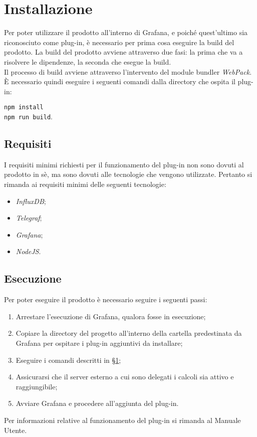 \section{Installazione}\label{Installazione}
Per poter utilizzare il prodotto all'interno di Grafana, e poiché quest'ultimo sia riconosciuto come plug-in, è necessario per prima cosa eseguire la build del prodotto.
La build del prodotto avviene attraverso due fasi: la prima che va a risolvere le dipendenze, la seconda che esegue la build.\\
Il processo di build avviene attraverso l'intervento del module bundler \textit{WebPack}.
È necessario quindi eseguire i seguenti comandi dalla directory che ospita il plug-in:
\begin{center}
	\texttt{npm install}\\
	\texttt{npm run build}.
\end{center}

\subsection{Requisiti}\label{Requisiti}
I requisiti minimi richiesti per il funzionamento del plug-in non sono dovuti al prodotto in sè, ma sono dovuti alle tecnologie che vengono utilizzate. Pertanto si rimanda ai requisiti minimi delle seguenti tecnologie:
\begin{itemize}
	\item \textit{InfluxDB};
	\item \textit{Telegraf};
	\item \textit{Grafana};
	\item \textit{NodeJS}.
\end{itemize}

\subsection{Esecuzione}\label{run}
Per poter eseguire il prodotto è necessario seguire i seguenti passi:
\begin{enumerate}
	\item Arrestare l'esecuzione di Grafana, qualora fosse in esecuzione;
	\item Copiare la directory del progetto all'interno della cartella predestinata da Grafana per ospitare i plug-in aggiuntivi da installare;
	\item Eseguire i comandi descritti in §\ref{Installazione};
	\item Assicurarsi che il server esterno a cui sono delegati i calcoli sia attivo e raggiungibile;
	\item Avviare Grafana e procedere all'aggiunta del plug-in.
\end{enumerate}
Per informazioni relative al funzionamento del plug-in si rimanda al Manuale Utente.